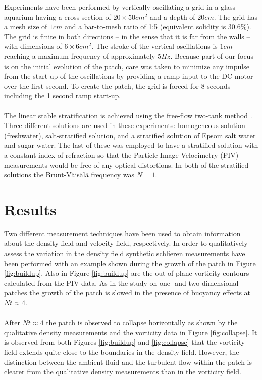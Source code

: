\documentclass[10pt,a4paper]{article}
\begin{document}
Experiments have been performed by vertically oscillating a grid in a glass aquarium having a cross-section of $20\times50\unit{cm^2}$ and a depth of $20\unit{cm}$.  The grid has a mesh size of $1\unit{cm}$ and a bar-to-mesh ratio of 1:5 (equivalent solidity is 30.6\%).  The grid is finite in both directions -- in the sense that it is far from the walls -- with dimensions of $6\times6\unit{cm^2}$.  The stroke of the vertical oscillations is $1\unit{cm}$ reaching a maximum frequency of approximately $5\unit{Hz}$.  Because part of our focus is on the initial evolution of the patch, care was taken to minimize any impulse from the start-up of the oscillations by providing a ramp input to the DC motor over the first second.  To create the patch, the grid is forced for 8 seconds including the 1 second ramp start-up.
\\\\
The linear stable stratification is achieved using the free-flow two-tank method \cite{Economidou2009}.  Three different solutions are used in these experiments: homogeneous solution (freshwater), salt-stratified solution, and a stratified solution of Epsom salt water and sugar water.  The last of these was employed to have a stratified solution with a constant index-of-refraction \cite{McDougall1979} so that the Particle Image Velocimetry (PIV) measurements would be free of any optical distortions.  In both of the stratified solutions the Brunt-V\"ais\"al\"a frequency was $N=1$.

\section{Results}

Two different measurement techniques have been used to obtain information about the density field and velocity field, respectively.  In order to qualitatively assess the variation in the density field synthetic schlieren measurements \cite{Aguilar2006} have been performed with an example shown during the growth of the patch in Figure \ref{fig:buildup}.  Also in Figure \ref{fig:buildup} are the out-of-plane vorticity contours calculated from the PIV data.  As in the study on one- and two-dimensional patches \cite{Fernando1988,Silva1998} the growth of the patch is slowed in the presence of buoyancy effects at $Nt\approx4$.
\\\\
After $Nt\approx4$ the patch is observed to collapse horizontally as shown by the qualitative density measurements and the vorticity data in Figure \ref{fig:collapse}.  It is observed from both Figures \ref{fig:buildup} and \ref{fig:collapse} that the vorticity field extends quite close to the boundaries in the density field.  However, the distinction between the ambient fluid and the turbulent flow within the patch is clearer from the qualitative density measurements than in the vorticity field.
\end{document}
